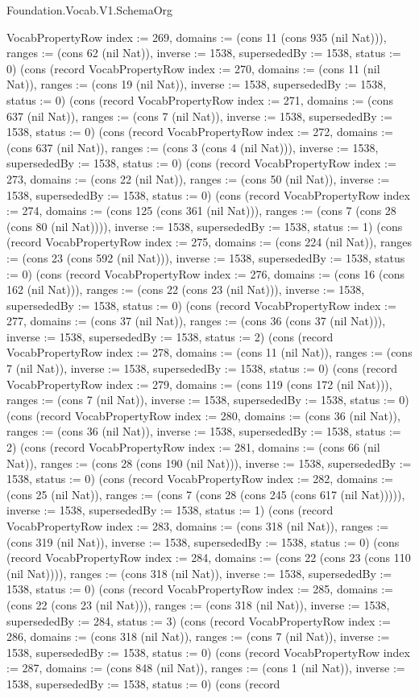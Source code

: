 \begin{lexlean}{Foundation.Vocab.V1.SchemaOrg}
\begin{semanticmodule}
{VocabPropertyRow {index := 269, domains := (cons 11 (cons 935 (nil Nat))), ranges := (cons 62 (nil Nat)), inverse := 1538, supersededBy := 1538, status := 0}) (cons (record VocabPropertyRow {index := 270, domains := (cons 11 (nil Nat)), ranges := (cons 19 (nil Nat)), inverse := 1538, supersededBy := 1538, status := 0}) (cons (record VocabPropertyRow {index := 271, domains := (cons 637 (nil Nat)), ranges := (cons 7 (nil Nat)), inverse := 1538, supersededBy := 1538, status := 0}) (cons (record VocabPropertyRow {index := 272, domains := (cons 637 (nil Nat)), ranges := (cons 3 (cons 4 (nil Nat))), inverse := 1538, supersededBy := 1538, status := 0}) (cons (record VocabPropertyRow {index := 273, domains := (cons 22 (nil Nat)), ranges := (cons 50 (nil Nat)), inverse := 1538, supersededBy := 1538, status := 0}) (cons (record VocabPropertyRow {index := 274, domains := (cons 125 (cons 361 (nil Nat))), ranges := (cons 7 (cons 28 (cons 80 (nil Nat)))), inverse := 1538, supersededBy := 1538, status := 1}) (cons (record VocabPropertyRow {index := 275, domains := (cons 224 (nil Nat)), ranges := (cons 23 (cons 592 (nil Nat))), inverse := 1538, supersededBy := 1538, status := 0}) (cons (record VocabPropertyRow {index := 276, domains := (cons 16 (cons 162 (nil Nat))), ranges := (cons 22 (cons 23 (nil Nat))), inverse := 1538, supersededBy := 1538, status := 0}) (cons (record VocabPropertyRow {index := 277, domains := (cons 37 (nil Nat)), ranges := (cons 36 (cons 37 (nil Nat))), inverse := 1538, supersededBy := 1538, status := 2}) (cons (record VocabPropertyRow {index := 278, domains := (cons 11 (nil Nat)), ranges := (cons 7 (nil Nat)), inverse := 1538, supersededBy := 1538, status := 0}) (cons (record VocabPropertyRow {index := 279, domains := (cons 119 (cons 172 (nil Nat))), ranges := (cons 7 (nil Nat)), inverse := 1538, supersededBy := 1538, status := 0}) (cons (record VocabPropertyRow {index := 280, domains := (cons 36 (nil Nat)), ranges := (cons 36 (nil Nat)), inverse := 1538, supersededBy := 1538, status := 2}) (cons (record VocabPropertyRow {index := 281, domains := (cons 66 (nil Nat)), ranges := (cons 28 (cons 190 (nil Nat))), inverse := 1538, supersededBy := 1538, status := 0}) (cons (record VocabPropertyRow {index := 282, domains := (cons 25 (nil Nat)), ranges := (cons 7 (cons 28 (cons 245 (cons 617 (nil Nat))))), inverse := 1538, supersededBy := 1538, status := 1}) (cons (record VocabPropertyRow {index := 283, domains := (cons 318 (nil Nat)), ranges := (cons 319 (nil Nat)), inverse := 1538, supersededBy := 1538, status := 0}) (cons (record VocabPropertyRow {index := 284, domains := (cons 22 (cons 23 (cons 110 (nil Nat)))), ranges := (cons 318 (nil Nat)), inverse := 1538, supersededBy := 1538, status := 0}) (cons (record VocabPropertyRow {index := 285, domains := (cons 22 (cons 23 (nil Nat))), ranges := (cons 318 (nil Nat)), inverse := 1538, supersededBy := 284, status := 3}) (cons (record VocabPropertyRow {index := 286, domains := (cons 318 (nil Nat)), ranges := (cons 7 (nil Nat)), inverse := 1538, supersededBy := 1538, status := 0}) (cons (record VocabPropertyRow {index := 287, domains := (cons 848 (nil Nat)), ranges := (cons 1 (nil Nat)), inverse := 1538, supersededBy := 1538, status := 0}) (cons (record }
\end{semanticmodule}
\end{lexlean}

